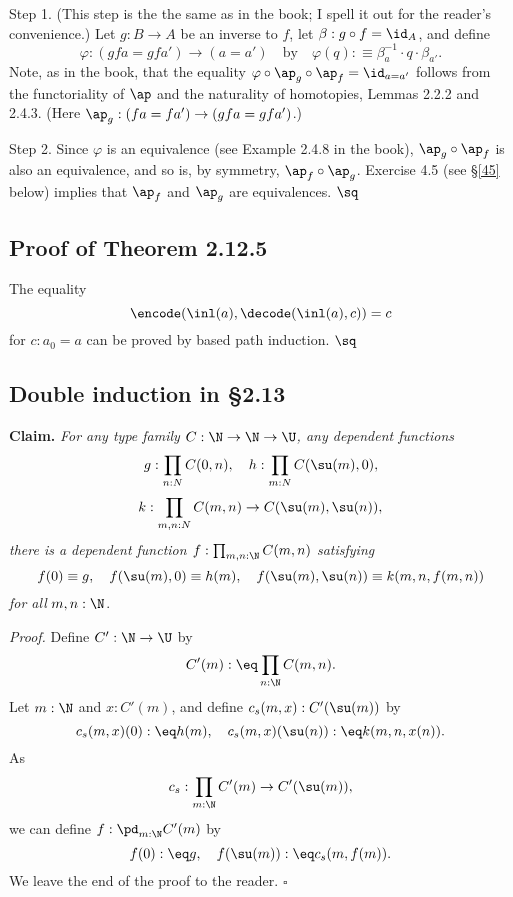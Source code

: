 \documentclass[12pt]{article}
\begin{document}
Step 1. (This step is the the same as in the book; I spell it out for the reader's convenience.) Let $g:B\to A$ be an inverse to $f$, let $\beta:g\circ f=\id_A$, and define 
$$
\varphi:(gfa=gfa')\to(a=a')\quad\text{by}\quad\varphi(q):\equiv\beta_a^{-1}\cdot q\cdot\beta_{a'}.
$$ 
Note, as in the book, that the equality $\varphi\circ\ap_g\circ\ap_f=\id_{a=a'}$ follows from the functoriality of $\ap$ and the naturality of homotopies, Lemmas 2.2.2 and 2.4.3. (Here $\ap_g:(fa=fa')\to (gfa=gfa')$.)

Step 2. Since $\varphi$ is an equivalence (see Example 2.4.8 in the book), $\ap_g\circ\ap_f$ is also an equivalence, and so is, by symmetry, $\ap_f\circ\ap_g$. Exercise 4.5 (see \S\ref{45} below) implies that $\ap_f$ and $\ap_g$ are equivalences. $\sq$


\subsection{Proof of Theorem 2.12.5}

The equality 
$$
\encode(\inl(a),\decode(\inl(a),c))=c
$$ 
for $c:a_0=a$ can be proved by based path induction. $\sq$



\subsection{Double induction in \S2.13}

\nn\textbf{Claim.} \emph{For any type family $C:\N\to\N\to\U$, any dependent functions}
$$
g:\prod_{n:N}C(0,n),\quad h:\prod_{m:N}C(\su(m),0),
$$
$$
k:\prod_{m,n:N}C(m,n)\to C(\su(m),\su(n)),
$$ 
\emph{there is a dependent function $f:\prod_{m,n:\N}C(m,n)$ satisfying}
$$
f(0)\equiv g,\quad f(\su(m),0)\equiv h(m),\quad f(\su(m),\su(n))\equiv k(m,n,f(m,n))
$$ 
\emph{for all} $m,n:\N$.

\nn\emph{Proof.} Define $C':\N\to\U$ by 
$$
C'(m):\eq\prod_{n:\N}C(m,n).
$$ 
Let $m:\N$ and $x:C'(m)$, and define $c_s(m,x):C'(\su(m))$ by 
$$
c_s(m,x)(0):\eq h(m),\quad c_s(m,x)(\su(n)):\eq k(m,n,x(n)).
$$ 
As  
$$
c_s:\prod_{m:\N}C'(m)\to C'(\su(m)),
$$ 
we can define $f:\pd_{m:\N}C'(m)$ by 
$$
f(0):\eq g,\quad f(\su(m)):\eq c_s(m,f(m)).
$$ 
We leave the end of the proof to the reader. $\square$

\end{document}
